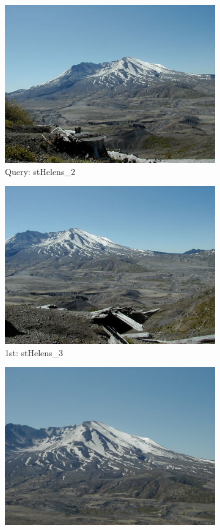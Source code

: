 \begin{itemize}
\begin{figure}[H]
	\centering
	\begin{subfigure}{0.25\textwidth}
	  \centering
	  \includegraphics[width=0.9\linewidth]{../input/stHelens_2.jpg}
	  \caption{Query: stHelens\_2}
	\end{subfigure}%
	\begin{subfigure}{0.25\textwidth}
	  \centering
	  \includegraphics[width=0.9\linewidth]{../input/stHelens_3.jpg}
	  \caption{1st: stHelens\_3}
	\end{subfigure}%
	\begin{subfigure}{0.25\textwidth}
        \centering
        \includegraphics[width=0.9\linewidth]{../input/stHelens_5.jpg}

\end{subfigure}
\end{figure}
\end{itemize}
